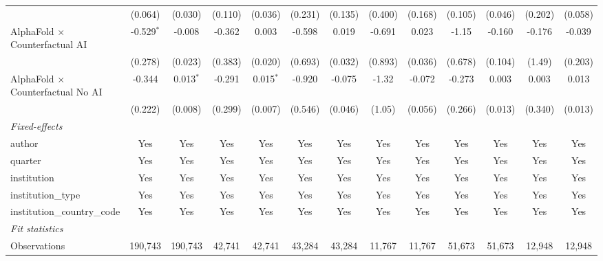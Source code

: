 \begin{tabular}{lcccccccccccc}
                                            & (0.064)       & (0.030)      & (0.110)       & (0.036)      & (0.231) & (0.135) & (0.400) & (0.168) & (0.105) & (0.046) & (0.202)      & (0.058)\\   
   AlphaFold $\times$ Counterfactual AI     & -0.529$^{*}$  & -0.008       & -0.362        & 0.003        & -0.598  & 0.019   & -0.691  & 0.023   & -1.15   & -0.160  & -0.176       & -0.039\\   
                                            & (0.278)       & (0.023)      & (0.383)       & (0.020)      & (0.693) & (0.032) & (0.893) & (0.036) & (0.678) & (0.104) & (1.49)       & (0.203)\\   
   AlphaFold $\times$ Counterfactual No AI  & -0.344        & 0.013$^{*}$  & -0.291        & 0.015$^{*}$  & -0.920  & -0.075  & -1.32   & -0.072  & -0.273  & 0.003   & 0.003        & 0.013\\   
                                            & (0.222)       & (0.008)      & (0.299)       & (0.007)      & (0.546) & (0.046) & (1.05)  & (0.056) & (0.266) & (0.013) & (0.340)      & (0.013)\\   
   \midrule
   \emph{Fixed-effects}\\
   author                                   & Yes           & Yes          & Yes           & Yes          & Yes     & Yes     & Yes     & Yes     & Yes     & Yes     & Yes          & Yes\\  
   quarter                                  & Yes           & Yes          & Yes           & Yes          & Yes     & Yes     & Yes     & Yes     & Yes     & Yes     & Yes          & Yes\\  
   institution                              & Yes           & Yes          & Yes           & Yes          & Yes     & Yes     & Yes     & Yes     & Yes     & Yes     & Yes          & Yes\\  
   institution\_type                        & Yes           & Yes          & Yes           & Yes          & Yes     & Yes     & Yes     & Yes     & Yes     & Yes     & Yes          & Yes\\  
   institution\_country\_code               & Yes           & Yes          & Yes           & Yes          & Yes     & Yes     & Yes     & Yes     & Yes     & Yes     & Yes          & Yes\\  
   \midrule
   \emph{Fit statistics}\\
   Observations                             & 190,743       & 190,743      & 42,741        & 42,741       & 43,284  & 43,284  & 11,767  & 11,767  & 51,673  & 51,673  & 12,948       & 12,948\\  

\end{tabular}
